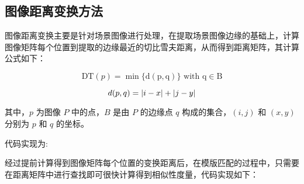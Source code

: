 \subsection{图像距离变换方法}

图像距离变换主要是针对场景图像进行处理，在提取场景图像边缘的基础上，计算图像矩阵每个位置到提取的边缘最近的切比雪夫距离，从而得到距离矩阵，其计算公式如下：

\begin{equation}
\mathrm{DT}(p)=\min \{\mathrm{d}(\mathrm{p}, \mathrm{q})\} \text { with } \mathrm{q} \in \mathrm{B}
\end{equation}

\begin{equation}
d(p,q)=|i-x|+|j-y|
\vspace{0.5cm}
\end{equation}

其中，$p$ 为图像 $P$ 中的点，$B$ 是由 $P$ 的边缘点 $q$ 构成的集合，$(i,j)$ 和 $(x,y)$ 分别为 $p$ 和 $q$ 的坐标。

代码实现为:

\vspace{0.3cm}


经过提前计算得到图像矩阵每个位置的变换距离后，在模版匹配的过程中，只需要在距离矩阵中进行查找即可很快计算得到相似性度量，代码实现如下：

\vspace{0.3cm}
